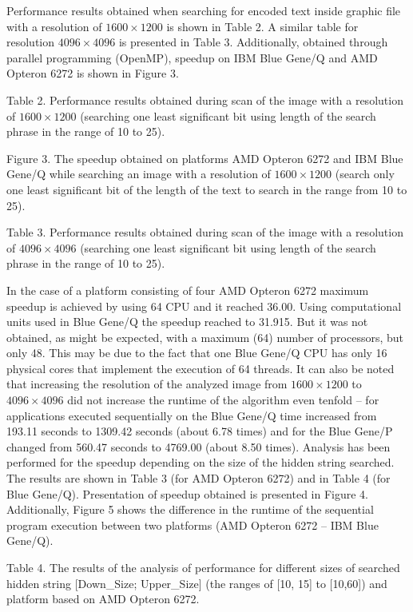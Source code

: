 \documentclass[10pt, a5paper]{article}
\begin{document}
Performance results obtained when searching for encoded text inside graphic file with a resolution of $1600\times1200$ is shown in Table 2. A similar table for resolution $4096\times4096$ is presented in Table 3. Additionally, obtained through parallel programming (OpenMP), speedup on IBM Blue Gene/Q and AMD Opteron 6272 is shown in Figure 3.


Table 2. Performance results obtained during scan of the image with a resolution of $1600\times1200$ (searching one least significant bit using length of the search phrase in the range of 10 to 25).

Figure 3. The speedup obtained on platforms AMD Opteron 6272 and IBM Blue Gene/Q while searching an image with a resolution of $1600\times1200$ (search only one least significant bit of the length of the text to search in the range from 10 to 25).

Table 3. Performance results obtained during scan of the image with a resolution of $4096\times4096$ (searching one least significant bit using length of the search phrase in the range of 10 to 25).

In the case of a platform consisting of four AMD Opteron 6272 maximum speedup is achieved by using 64 CPU and it reached 36.00. Using computational units used in Blue Gene/Q the speedup reached to 31.915. But it was not obtained, as might be expected, with a maximum (64) number of processors, but only 48. This may be due to the fact that one Blue Gene/Q CPU has only 16 physical cores that implement the execution of 64 threads.
It can also be noted that increasing the resolution of the analyzed image from $1600\times1200$ to $4096\times4096$ did not increase the runtime of the algorithm even tenfold -- for applications executed sequentially on the Blue Gene/Q time increased from 193.11 seconds to 1309.42 seconds (about 6.78 times) and for the Blue Gene/P changed from 560.47 seconds to 4769.00 (about 8.50 times). Analysis has been performed for the speedup depending on the size of the hidden string searched. The results are shown in Table 3 (for AMD Opteron 6272) and in Table 4 (for Blue Gene/Q). Presentation of speedup obtained is presented in Figure 4. Additionally, Figure 5 shows the difference in the runtime of the sequential program execution between two platforms (AMD Opteron 6272 -- IBM Blue Gene/Q).


Table 4. The results of the analysis of performance for different sizes of searched hidden string [Down\_Size; Upper\_Size] (the ranges of [10, 15] to [10,60]) and platform based on AMD Opteron 6272.
\end{document}
